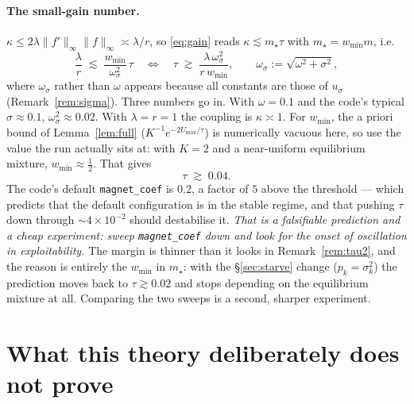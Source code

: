 \documentclass[11pt,a4paper]{article}
\theoremstyle{plain}
\theoremstyle{definition}
\theoremstyle{remark}
\newcommand{\norm}[1]{\lVert #1 \rVert}
\begin{document}
\paragraph{The small-gain number.} $\kappa \le 2\lambda\norm{f'}_\infty\norm{f}_\infty
\asymp\lambda/r$, so \eqref{eq:gain} reads $\kappa\lesssim m_\star\tau$ with
$m_\star=w_{\min}m$, i.e.
\[
\frac{\lambda}{r} \;\lesssim\; \frac{w_{\min}}{\omega_\sigma^2}\,\tau
\quad\Longleftrightarrow\quad
\tau \;\gtrsim\; \frac{\lambda\,\omega_\sigma^2}{r\,w_{\min}},
\qquad \omega_\sigma:=\sqrt{\omega^2+\sigma^2},
\]
where $\omega_\sigma$ rather than $\omega$ appears because all constants are those of
$u_\sigma$ (Remark~\ref{rem:sigma}). Three numbers go in. With $\omega=0.1$ and the
code's typical $\sigma\approx0.1$, $\omega_\sigma^2\approx0.02$. With $\lambda=r=1$ the
coupling is $\kappa\asymp1$. For $w_{\min}$, the a priori bound of
Lemma~\ref{lem:full} ($K^{-1}e^{-2U_{\max}/\tau}$) is numerically vacuous here, so use
the value the run actually sits at: with $K=2$ and a near-uniform equilibrium mixture,
$w_{\min}\approx\tfrac12$. That gives
\[
\tau \;\gtrsim\; 0.04 .
\]
The code's default \texttt{magnet\_coef} is $0.2$, a factor of $5$ above the threshold
--- which predicts that the default configuration is in the stable regime, and that
pushing $\tau$ down through $\sim\!4\times10^{-2}$ should destabilise it. \emph{That is a
falsifiable prediction and a cheap experiment: sweep \texttt{magnet\_coef} down and look
for the onset of oscillation in exploitability.} The margin is thinner than it looks in
Remark~\ref{rem:tau2}, and the reason is entirely the $w_{\min}$ in $m_\star$: with the
\S\ref{sec:starve} change ($p_k=\sigma_k^2$) the prediction moves back to
$\tau\gtrsim0.02$ and stops depending on the equilibrium mixture at all. Comparing the
two sweeps is a second, sharper experiment.

\section{What this theory deliberately does not prove}
\end{document}
